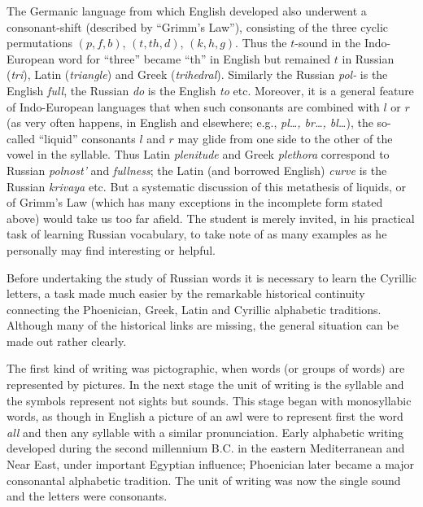 The Germanic language from which English developed also underwent a consonant-shift (described by ``Grimm's Law''), consisting of the three cyclic permutations $(p,f,b)$, $(t,th,d)$, $(k,h,g)$. Thus the $t$-sound in the Indo-European word for ``three'' became ``th'' in English but remained $t$ in Russian (\emph{tri}), Latin (\emph{triangle}) and Greek (\emph{trihedral}). Similarly the Russian \emph{pol-} is the English \emph{full}, the Russian \emph{do} is the English \emph{to} etc. Moreover, it is a general feature of Indo-European languages that when such consonants are combined with $l$ or $r$ (as very often happens, in English and elsewhere; e.g., \emph{pl\ldots, br\ldots, bl\ldots}), the so-called ``liquid'' consonants $l$ and $r$ may glide from one side to the other of the vowel in the syllable. Thus Latin \emph{plenitude} and Greek \emph{plethora} correspond to Russian \emph{polnost'} and \emph{fullness}; the Latin (and borrowed English) \emph{curve} is the Russian \emph{krivaya} etc. But a systematic discussion of this metathesis of liquids, or of Grimm's Law (which has many exceptions in the incomplete form stated above) would take us too far afield. The student is merely invited, in his practical task of learning Russian vocabulary, to take note of as many examples as he personally may find interesting or helpful.


Before undertaking the study of Russian words it is necessary to learn the Cyrillic letters, a task made much easier by the remarkable historical continuity connecting the Phoenician, Greek, Latin and Cyrillic alphabetic traditions. Although many of the historical links are missing, the general situation can be made out rather clearly.

The first kind of writing was pictographic, when words (or groups of words) are represented by pictures. In the next stage the unit of writing is the syllable and the symbols represent not sights but sounds. This stage began with monosyllabic words, as though in English a picture of an awl were to represent first the word \emph{all} and then any syllable with a similar pronunciation. Early alphabetic writing developed during the second millennium B.C. in the eastern Mediterranean and Near East, under important Egyptian influence; Phoenician later became a major consonantal alphabetic tradition. The unit of writing was now the single sound and the letters were consonants.

